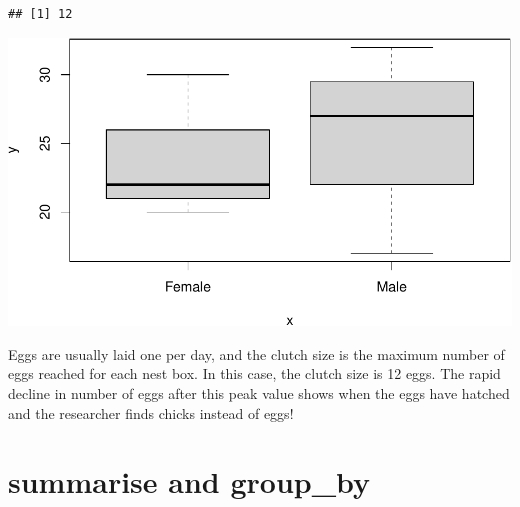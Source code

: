 \documentclass[
  a4paperpaper,
]{book}
\newenvironment{Shaded}{\begin{snugshade}}{\end{snugshade}}
\newcommand{\CommentTok}[1]{\textcolor[rgb]{0.56,0.35,0.01}{\textit{#1}}}
\newcommand{\DataTypeTok}[1]{\textcolor[rgb]{0.13,0.29,0.53}{#1}}
\newcommand{\DecValTok}[1]{\textcolor[rgb]{0.00,0.00,0.81}{#1}}
\newcommand{\KeywordTok}[1]{\textcolor[rgb]{0.13,0.29,0.53}{\textbf{#1}}}
\newcommand{\NormalTok}[1]{#1}
\newcommand{\OperatorTok}[1]{\textcolor[rgb]{0.81,0.36,0.00}{\textbf{#1}}}
\newcommand{\StringTok}[1]{\textcolor[rgb]{0.31,0.60,0.02}{#1}}
\begin{document}
\begin{Shaded}
\end{Shaded}

\begin{verbatim}
## [1] 12
\end{verbatim}

\begin{Shaded}
\end{Shaded}

\includegraphics{BB852_files/figure-latex/unnamed-chunk-43-1.pdf}

Eggs are usually laid one per day, and the clutch size is the maximum number of eggs reached for each nest box. In this case, the clutch size is 12 eggs. The rapid decline in number of eggs after this peak value shows when the eggs have hatched and the researcher finds chicks instead of eggs!

\hypertarget{summarise-and-group_by}{%
\section{summarise and group\_by}\label{summarise-and-group_by}}
\end{document}
